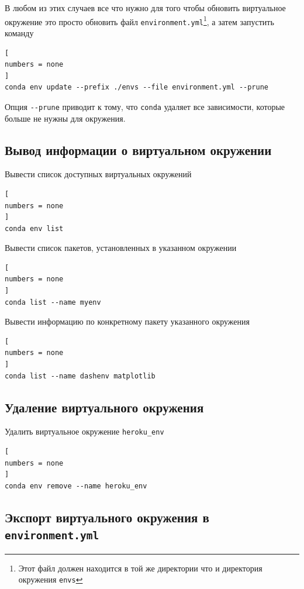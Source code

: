 \documentclass[%
	11pt,
	a4paper,
	utf8,
		]{article}
\begin{document}
В любом из этих случаев все что нужно для того чтобы обновить виртуальное окружение это просто обновить файл \texttt{environment.yml}\footnote{Этот файл должен находится в той же директории что и директория окружения \texttt{envs}}, а затем запустить команду

\begin{lstlisting}[
numbers = none
]
conda env update --prefix ./envs --file environment.yml --prune
\end{lstlisting}

Опция \lstinline{--prune} приводит к тому, что \texttt{conda} удаляет все зависимости, которые больше не нужны для окружения.

\subsection{Вывод информации о виртуальном окружении}

Вывести список доступных виртуальных окружений

\begin{lstlisting}[
numbers = none
]
conda env list
\end{lstlisting}

Вывести список пакетов, установленных в указанном окружении

\begin{lstlisting}[
numbers = none
]
conda list --name myenv
\end{lstlisting}

Вывести информацию по конкретному пакету указанного окружения

\begin{lstlisting}[
numbers = none
]
conda list --name dashenv matplotlib
\end{lstlisting}


\subsection{Удаление виртуального окружения}

Удалить виртуальное окружение \texttt{heroku\_env}

\begin{lstlisting}[
numbers = none
]
conda env remove --name heroku_env
\end{lstlisting}

\subsection{Экспорт виртуального окружения в \texttt{environment.yml}}
\end{document}
